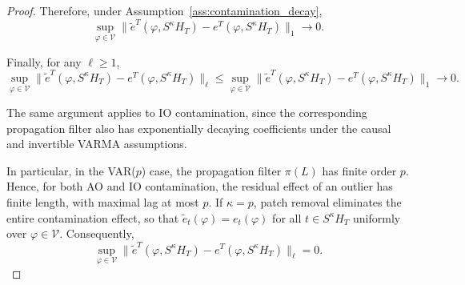 \documentclass[10pt,a4paper]{amsart}
\begin{document}
\begin{proof}
Therefore, under Assumption~\ref{ass:contamination_decay},
\begin{equation}
\sup_{\varphi \in \mathcal V}
\|\tilde{e}^T(\varphi,S^\kappa H_T)-e^T(\varphi,S^\kappa H_T)\|_1 \to 0.
\end{equation}

Finally, for any $\ell\ge 1$,
\begin{equation}
\sup_{\varphi \in \mathcal V}
\|\tilde{e}^T(\varphi,S^\kappa H_T)-e^T(\varphi,S^\kappa H_T)\|_\ell
\le
\sup_{\varphi \in \mathcal V}
\|\tilde{e}^T(\varphi,S^\kappa H_T)-e^T(\varphi,S^\kappa H_T)\|_1
\to 0.
\end{equation}

The same argument applies to IO contamination, since the corresponding propagation filter also has exponentially decaying coefficients under the causal and invertible VARMA assumptions.

In particular, in the VAR($p$) case, the propagation filter $\pi(L)$ has finite order $p$.
Hence,
for both AO and IO contamination, the residual effect of an outlier has finite length, with maximal lag at most $p$.
If $\kappa = p$, patch removal eliminates the entire contamination effect, so that
$\tilde{e}_t(\varphi)=e_t(\varphi)$
for all $t \in S^\kappa H_T$
uniformly over $\varphi \in \mathcal V$.
Consequently,
\begin{equation}
\sup_{\varphi \in \mathcal V}
\|\tilde{e}^T(\varphi,S^\kappa H_T)-e^T(\varphi,S^\kappa H_T)\|_\ell
= 0.
\end{equation}
\end{proof}
\end{document}
